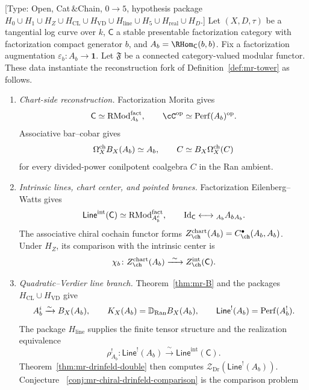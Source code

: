 \begin{theorem}
\label{thm:mr-master}
\ClaimStatusConditional
{}
\textup{[Type: Open, Cat$\,\&$Chain, $0\rightarrow 5$, hypothesis
package
$H_0\cup H_1\cup H_Z\cup H_{\mathrm{CL}}\cup
H_{\mathrm{VD}}\cup H_{\mathrm{line}}\cup H_5\cup
H_{\mathrm{real}}\cup H_D$.]}
Let $(X,D,\tau)$ be a tangential log curve over $k$,
$\mathsf C$ a stable presentable factorization category with
factorization compact generator $b$, and
$A_b=\RHom_{\mathsf C}(b,b)$.  Fix a factorization augmentation
$\varepsilon_b\colon A_b\to\mathbf1$.  Let $\mathfrak F$ be a
connected category-valued modular functor.  These data instantiate
the reconstruction fork of Definition~\ref{def:mr-tower} as follows.
\begin{enumerate}[label=\textup{(M\arabic*)}]
\item \label{M1}
\emph{Chart-side reconstruction.}
Factorization Morita gives
\[
 \mathsf C\simeq\mathrm{RMod}^{\fact}_{A_b},
 \qquad
 \cC^\op\simeq\mathrm{Perf}(A_b)^\op.
\]
Associative bar--cobar gives
\[
 \Omega^{\mathrm{ch}}_XB_X(A_b)\simeq A_b,
 \qquad
 C\simeq B_X\Omega^{\mathrm{ch}}_X(C)
\]
for every divided-power conilpotent coalgebra $C$ in the Ran ambient.
\item \label{M2}
\emph{Intrinsic lines, chart center, and pointed branes.}
Factorization Eilenberg--Watts gives
\[
 \mathsf{Line}^{\mathrm{int}}(\mathsf C)
 \simeq \mathrm{RMod}^{\mathrm{fact}}_{A_b^e},
 \qquad
 \operatorname{Id}_{\mathsf C}\longleftrightarrow{}_{A_b}A_b{}_{A_b}.
\]
The associative chiral cochain functor forms
$Z_{\ch}^{\mathrm{chart}}(A_b)=C^\bullet_{\ch}(A_b,A_b)$.
Under $H_Z$, its comparison with the intrinsic center is
\[
 \chi_b\colon Z_{\ch}^{\mathrm{chart}}(A_b)
 \xrightarrow{\ \sim\ }
 Z_{\ch}^{\mathrm{int}}(\mathsf C).
\]
\item \label{M3}
\emph{Quadratic--Verdier line branch.}
Theorem~\ref{thm:mr-B} and the packages
$H_{\mathrm{CL}}\cup H_{\mathrm{VD}}$ give
\[
 A_b^i\xrightarrow{\sim}B_X(A_b),
 \qquad
 K_X(A_b)=\mathbb D_{\mathrm{Ran}}B_X(A_b),
 \qquad
 \mathsf{Line}^{!}(A_b)=\mathrm{Perf}(A_b^!).
\]
The package $H_{\mathrm{line}}$ supplies the finite tensor structure
and the realization equivalence
\[
 \rho_{A_b}^!\colon\mathsf{Line}^{!}(A_b)
 \xrightarrow{\ \sim\ }
 \mathsf{Line}^{\mathrm{int}}(\mathsf C).
\]
Theorem~\ref{thm:mr-drinfeld-double} then computes
$\mathcal Z_{\mathrm{Dr}}(\mathsf{Line}^{!}(A_b))$.  Conjecture~
\ref{conj:mr-chiral-drinfeld-comparison} is the comparison problem

\end{enumerate}
\end{theorem}
